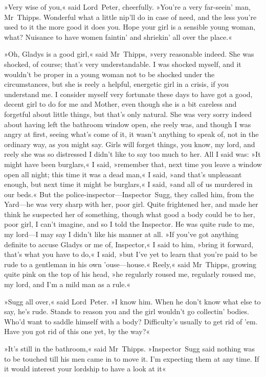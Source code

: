 »Very wise of you,« said Lord~Peter, cheerfully. »You're a very far-seein' man, Mr~Thipps. Wonderful what a little nip'll do in case of need, and the less you're used to it the more good it does you. Hope your girl is a sensible young woman, what? Nuisance to have women faintin' and shriekin' all over the place.«

»Oh, Gladys is a good girl,« said Mr~Thipps, »very reasonable indeed. She was shocked, of course; that's very understandable. I was shocked myself, and it wouldn't be proper in a young woman not to be shocked under the circumstances, but she is reely a helpful, energetic girl in a crisis, if you understand me. I consider myself very fortunate these days to have got a good, decent girl to do for me and Mother, even though she is a bit careless and forgetful about little things, but that's only natural. She was very sorry indeed about having left the bathroom window open, she reely was, and though I was angry at first, seeing what's come of it, it wasn't anything to speak of, not in the ordinary way, as you might say. Girls will forget things, you know, my lord, and reely she was so distressed I didn't like to say too much to her. All I said was: »It might have been burglars,« I said, »remember that, next time you leave a window open all night; this time it was a dead man,« I said, »and that's unpleasant enough, but next time it might be burglars,« I said, »and all of us murdered in our beds.« But the police-inspector—Inspector~Sugg, they called him, from the Yard—he was very sharp with her, poor girl. Quite frightened her, and made her think he suspected her of something, though what good a body could be to her, poor girl, I can't imagine, and so I told the Inspector. He was quite rude to me, my lord—I may say I didn't like his manner at all. »If you've got anything definite to accuse Gladys or me of, Inspector,« I said to him, »bring it forward, that's what you have to do,« I said, »but I've yet to learn that you're paid to be rude to a gentleman in his own 'ouse—house.« Reely,« said Mr~Thipps, growing quite pink on the top of his head, »he regularly roused me, regularly roused me, my lord, and I'm a mild man as a rule.«

»Sugg all over,« said Lord~Peter. »I know him. When he don't know what else to say, he's rude. Stands to reason you and the girl wouldn't go collectin' bodies. Who'd want to saddle himself with a body? Difficulty's usually to get rid of 'em. Have you got rid of this one yet, by the way?«

»It's still in the bathroom,« said Mr~Thipps. »Inspector~Sugg said nothing was to be touched till his men came in to move it. I'm expecting them at any time. If it would interest your lordship to have a look at it\longdash«

